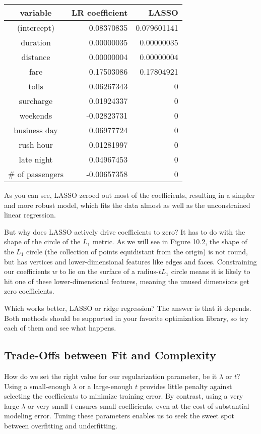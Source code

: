 \documentclass[10pt]{article}
\begin{document}
\begin{center}
\begin{tabular}{c|rr}
variable & LR coefficient & LASSO \\
\hline
(intercept) & 0.08370835 & 0.079601141 \\
duration & 0.00000035 & 0.00000035 \\
distance & 0.00000004 & 0.00000004 \\
fare & 0.17503086 & 0.17804921 \\
tolls & 0.06267343 & 0 \\
surcharge & 0.01924337 & 0 \\
weekends & -0.02823731 & 0 \\
business day & 0.06977724 & 0 \\
rush hour & 0.01281997 & 0 \\
late night & 0.04967453 & 0 \\
\# of passengers & -0.00657358 & 0 \\
\end{tabular}
\end{center}

As you can see, LASSO zeroed out most of the coefficients, resulting in a simpler and more robust model, which fits the data almost as well as the unconstrained linear regression.

But why does LASSO actively drive coefficients to zero? It has to do with the shape of the circle of the \(L_{1}\) metric. As we will see in Figure 10.2, the shape of the \(L_{1}\) circle (the collection of points equidistant from the origin) is not round, but has vertices and lower-dimensional features like edges and faces. Constraining our coefficients \(w\) to lie on the surface of a radius-\(t L_{1}\) circle means it is likely to hit one of these lower-dimensional features, meaning the unused dimensions get zero coefficients.

Which works better, LASSO or ridge regression? The answer is that it depends. Both methods should be supported in your favorite optimization library, so try each of them and see what happens.

\subsection{Trade-Offs between Fit and Complexity}
How do we set the right value for our regularization parameter, be it \(\lambda\) or \(t\)? Using a small-enough \(\lambda\) or a large-enough \(t\) provides little penalty against selecting the coefficients to minimize training error. By contrast, using a very large \(\lambda\) or very small \(t\) ensures small coefficients, even at the cost of substantial modeling error. Tuning these parameters enables us to seek the sweet spot between overfitting and underfitting.
\end{document}
